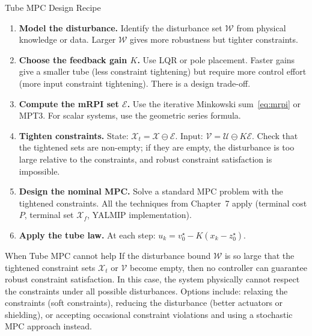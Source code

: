 \begin{summarybox}{Tube MPC Design Recipe}
	\begin{enumerate}
		\item \textbf{Model the disturbance.} Identify the disturbance set $\mathcal{W}$ from physical knowledge or data. Larger $\mathcal{W}$ gives more robustness but tighter constraints.

		\item \textbf{Choose the feedback gain $K$.} Use LQR or pole placement. Faster gains give a smaller tube (less constraint tightening) but require more control effort (more input constraint tightening). There is a design trade-off.

		\item \textbf{Compute the mRPI set $\mathcal{E}$.} Use the iterative Minkowski sum~\eqref{eq:mrpi} or MPT3. For scalar systems, use the geometric series formula.

		\item \textbf{Tighten constraints.} State: $\mathcal{X}_t = \mathcal{X} \ominus \mathcal{E}$. Input: $\mathcal{V} = \mathcal{U} \ominus K\mathcal{E}$. Check that the tightened sets are non-empty; if they are empty, the disturbance is too large relative to the constraints, and robust constraint satisfaction is impossible.

		\item \textbf{Design the nominal MPC.} Solve a standard MPC problem with the tightened constraints. All the techniques from Chapter~7 apply (terminal cost $P$, terminal set $\mathcal{X}_f$, YALMIP implementation).

		\item \textbf{Apply the tube law.} At each step: $u_k = v_0^\star - K(x_k - z_0^\star)$.
	\end{enumerate}
\end{summarybox}

\begin{alertbox}{When Tube MPC cannot help}
	If the disturbance bound $\mathcal{W}$ is so large that the tightened constraint sets $\mathcal{X}_t$ or $\mathcal{V}$ become empty, then no controller can guarantee robust constraint satisfaction. In this case, the system physically cannot respect the constraints under all possible disturbances. Options include: relaxing the constraints (soft constraints), reducing the disturbance (better actuators or shielding), or accepting occasional constraint violations and using a stochastic MPC approach instead.
\end{alertbox}


